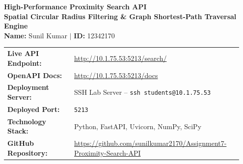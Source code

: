 \documentclass[11pt,a4paper]{article}
\begin{document}
\begin{center}
    {\LARGE \bfseries \color{primarycolor} High-Performance Proximity Search API}\\[0.2cm]
    {\large \bfseries Spatial Circular Radius Filtering \& Graph Shortest-Path Traversal Engine}\\[0.3cm]
    {\large \textbf{Name:} Sunil Kumar \quad $|$ \quad \textbf{ID:} 12342170}
\end{center}

\begin{tcolorbox}[colback=boxbg, colframe=primarycolor, boxrule=0.8pt, arc=3pt,
                  title={\bfseries Deployment \& Access Details}, fonttitle=\small, left=6pt, right=6pt, top=3pt, bottom=3pt]
\small
\begin{tabular}{@{}p{0.27\linewidth}p{0.68\linewidth}@{}}
\textbf{Live API Endpoint:} & \url{http://10.1.75.53:5213/search/} \\[2pt]
\textbf{OpenAPI Docs:} & \url{http://10.1.75.53:5213/docs} \\[2pt]
\textbf{Deployment Server:} & SSH Lab Server -- \texttt{ssh students@10.1.75.53} \\[2pt]
\textbf{Deployed Port:} & \texttt{5213} \\[2pt]
\textbf{Technology Stack:} & Python, FastAPI, Uvicorn, NumPy, SciPy \\[2pt]
\textbf{GitHub Repository:} & \url{https://github.com/sunilkumar2170/Assignment7-Proximity-Search-API} \\
\end{tabular}
\end{tcolorbox}

\begin{abstract}
\noindent This report documents the design, formulation, implementation, and verification of a RESTful Proximity Search API deployed at \url{http://10.1.75.53:5213/search/}. The API serves a dataset of 10,000 locations on a $100 \times 100$ lattice in the unit square. For each query it returns the 10 locations that (1) match the requested category, (2) lie inside a circular Euclidean search radius, and (3) are closest by \emph{road-network traversal distance}, because some direct links between points are missing. The system uses a 2D $k$-d tree (\texttt{cKDTree}) for spatial pruning, hash-based category indexes, a link-file parser that accepts both ID-pair and coordinate formats, and Dijkstra's algorithm on a Compressed Sparse Row (CSR) graph. All default structures are built once at startup, and the measured per-query latency is about 1.14~ms.
\end{abstract}
\end{document}

